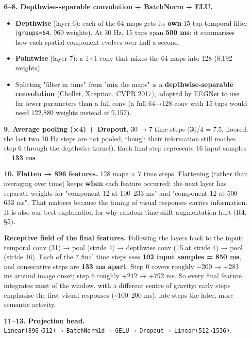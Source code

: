 \documentclass[
  11pt,
]{article}
\providecommand{\tightlist}{%
  \setlength{\itemsep}{0pt}\setlength{\parskip}{0pt}}
\renewcommand{\_}{\oldunderscore\allowbreak}
\begin{document}
\textbf{6--8. Depthwise-separable
convolution + BatchNorm + ELU.}

\begin{itemize}
\tightlist
\item
  \textbf{Depthwise} (layer 6): each of
  the 64 maps gets its \textbf{own}
  15-tap temporal filter
  (\texttt{groups=64}, 960 weights). At
  30 Hz, 15 taps span \textbf{500 ms}:
  it summarises how each spatial
  component evolves over half a second.
\item
  \textbf{Pointwise} (layer 7): a 1×1
  conv that mixes the 64 maps into 128
  (8,192 weights).
\item
  Splitting "filter in time" from "mix
  the maps" is a
  \textbf{depthwise-separable
  convolution} (Chollet, Xception, CVPR
  2017), adopted by EEGNet to use far
  fewer parameters than a full conv (a
  full 64→128 conv with 15 taps would
  need 122,880 weights instead of
  9,152).
\end{itemize}

\textbf{9. Average pooling (×4) +
Dropout.} 30 → 7 time steps (30/4 = 7.5,
floored: the last two 30 Hz steps are
not pooled, though their information
still reaches step 6 through the
depthwise kernel). Each final step
represents 16 input samples =
\textbf{133 ms}.

\textbf{10. Flatten → 896 features.} 128
maps × 7 time steps. Flattening (rather
than averaging over time) keeps
\textbf{when} each feature occurred: the
next layer has separate weights for
"component 12 at 100--233 ms" and
"component 12 at 500--633 ms". That
matters because the timing of visual
responses carries information. It is
also our best explanation for why random
time-shift augmentation hurt (R4, §5).

\textbf{Receptive field of the final
features.} Following the layers back to
the input: temporal conv (31) → pool
(stride 4) → depthwise conv (15 at
stride 4) → pool (stride 16). Each of
the 7 final time steps sees \textbf{102
input samples = 850 ms}, and consecutive
steps are \textbf{133 ms apart}. Step 0
covers roughly −200 → +283 ms around
image onset; step 6 roughly +242 → +792
ms. So every final feature integrates
most of the window, with a different
centre of gravity: early steps emphasise
the first visual responses
(\textasciitilde100--200 ms), late steps
the later, more semantic activity.

\textbf{11--13. Projection head.}
\texttt{Linear(896→512)\ →\ BatchNorm1d\ →\ GELU\ →\ Dropout\ →\ Linear(512→1536)}.
\end{document}
